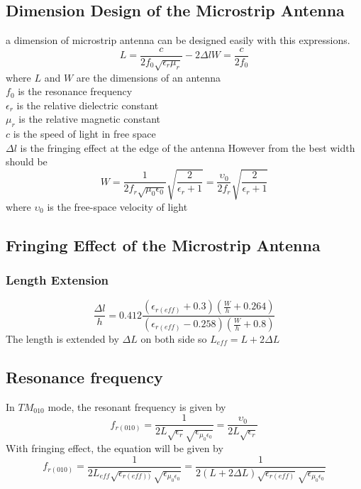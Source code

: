 \documentclass[11pt,a4paper]{article}
\begin{document}
    \subsection{Dimension Design of the Microstrip Antenna}
      \indent a dimension of microstrip antenna can be designed easily with this expressions\cite{NoK:05}.
      \begin{equation}
        L = \frac{c}{2f_0\sqrt{\epsilon_r\mu_r}} - 2\Delta l 
        W = \frac{c}{2f_0}
      \end{equation}
      \indent where $L$ and $W$ are the dimensions of an antenna\\[1ex]
      \indent $f_0$ is the resonance frequency\\[1ex]
      \indent $\epsilon_r$ is the relative dielectric constant\\[1ex]
      \indent $\mu_r$ is the relative magnetic constant\\[1ex]
      \indent $c$ is the speed of light in free space\\[1ex]
      \indent $\Delta l$ is the fringing effect at the edge of the antenna
      \indent However from \cite{CoB:05} the best width should be
      \begin{equation}
        W = \frac {1} {2 f_r \sqrt{\mu_{0} \epsilon_{0}}}\sqrt{\frac{2}{\epsilon_{r} + 1}} = \frac{\upsilon_{0}}{2f_{r}}\sqrt{\frac{2}{\epsilon_{r} + 1}}
      \end{equation}
      \indent where $\upsilon_{0}$ is the free-space velocity of light

    \subsection{Fringing Effect of the Microstrip Antenna}
      \subsubsection {Length Extension} 
      \begin{equation}
        \frac{\Delta l}{h}=0.412\frac{(\epsilon_{r(eff)}+0.3)(\frac{W}{h} + 0.264)}{(\epsilon_{r(eff)}-0.258)(\frac{W}{h} + 0.8)}
      \end{equation}
      \indent The length is extended by $\Delta L$ on both side so $L_{eff} = L + 2\Delta L$

    \subsection{Resonance frequency}
      \indent In $TM_{010}$ mode, the resonant frequency is given by
      \begin{equation}  
        f_{r(010)} =  \frac{1}{2 L\sqrt{\epsilon_{r}}\sqrt{\epsilon_{\mu_{0}\epsilon_{0}}}}= \frac{\upsilon_{0}}{2L\sqrt{\epsilon_{r}}}
      \end{equation}
      \indent With fringing effect, the equation will be given by
      \begin{equation} 
        f_{r(010)} =  \frac{1}{2 L_{eff}\sqrt{\epsilon_{r(eff))}}\sqrt{\epsilon_{\mu_{0}\epsilon_{0}}}}=\frac{1}{2(L + 2\Delta L)\sqrt{\epsilon_{r(eff)}}\sqrt{\epsilon_{\mu_{0}\epsilon_{0}}}}
      \end{equation}
\end{document}
